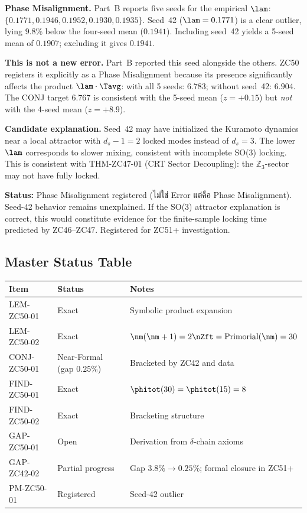 \documentclass[12pt, a4paper]{article}
\begin{document}
\begin{openqbox}[title={PM-ZC50-01: Seed-42 Outlier
  ($\lambda_2 = 0.1771$ vs mean $0.194$)}]
\textbf{Phase Misalignment.}
Part~B reports five seeds for the empirical $\lam$:
$\{0.1771, 0.1946, 0.1952, 0.1930, 0.1935\}$.
Seed~42 ($\lam=0.1771$) is a clear outlier, lying
$9.8\%$ below the four-seed mean ($0.1941$). Including seed~42
yields a 5-seed mean of $0.1907$; excluding it gives $0.1941$.

\textbf{This is not a new error.} Part~B reported this seed alongside
the others. ZC50 registers it explicitly as a Phase Misalignment
because its presence significantly affects the product
$\lam\cdot\Tavg$:
with all 5 seeds: $6.783$; without seed~42: $6.904$.
The CONJ target $6.767$ is consistent with the 5-seed mean
($z=+0.15$) but \emph{not} with the 4-seed mean ($z=+8.9$).

\textbf{Candidate explanation.}
Seed~42 may have initialized the Kuramoto dynamics near a local
attractor with $d_s{-}1 = 2$ locked modes instead of $d_s=3$.
The lower $\lam$ corresponds to slower mixing, consistent with
incomplete SO(3) locking. This is consistent with THM-ZC47-01
(CRT Sector Decoupling): the $\mathbb{Z}_3$-sector may not have
fully locked.

\textbf{Status:} Phase Misalignment registered (ไม่ใช่ Error
แต่คือ Phase Misalignment). Seed-42 behavior remains
unexplained. If the SO(3) attractor explanation is correct,
this would constitute evidence for the finite-sample locking
time predicted by ZC46--ZC47. Registered for ZC51+ investigation.
\end{openqbox}

\subsection{Master Status Table}

\begin{center}
\begin{tabular}{@{}lp{4cm}p{5.5cm}@{}}
\toprule
\textbf{Item} & \textbf{Status} & \textbf{Notes} \\
\midrule
LEM-ZC50-01 & Exact  & Symbolic product expansion \\
LEM-ZC50-02 & Exact  & $\nm(\nm+1)=2\nZft=\text{Primorial}(\nm)=30$ \\
CONJ-ZC50-01 & Near-Formal (gap $0.25\%$) & Bracketed by ZC42 and data \\
FIND-ZC50-01 & Exact  & $\phitot(30)=\phitot(15)=8$ \\
FIND-ZC50-02 & Exact  & Bracketing structure \\
GAP-ZC50-01  & Open   & Derivation from $\delta$-chain axioms \\
GAP-ZC42-02  & Partial progress & Gap $3.8\%\to0.25\%$; formal
  closure in ZC51+ \\
PM-ZC50-01   & Registered & Seed-42 outlier \\
\bottomrule
\end{tabular}
\end{center}
\end{document}
